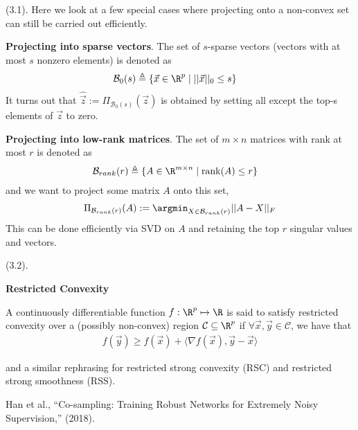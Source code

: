\documentclass[11pt]{article}
\begin{document}
\p {} (3.1). Here we look at a few special cases where projecting onto a non-convex set can still be carried out efficiently. 
\begin{compactitem}
	\item \textbf{Projecting into sparse vectors}. The set of $s$-sparse vectors (vectors with at most $s$ nonzero elements) is denoted as
	\begin{align}
	\mathcal{B}_0(s) 
	&\triangleq \{ \vec x  \in \R^p \mid ||\vec x ||_0 \le s   \}
	\end{align}
	It turns out that $\hat{\vec z} := \Pi_{\mathcal{B}_0(s)}(\vec z)$ is obtained by setting all except the top-s elements of $\vec z$ to zero. 
	
	\item \textbf{Projecting into low-rank matrices}. The set of $m \times n$ matrices with rank at most $r$ is denoted as
	\begin{align}
	\mathcal{B}_{rank}(r) 
	&\triangleq \{
	A \in \R^{m \times n} \mid
	\text{rank}(A) \le r
	\}
	\end{align}
	and we want to project some matrix $A$ onto this set,
	\begin{align}
	\Pi_{\mathcal{B}_{rank}(r)}(A)
	:= \argmin_{X \in \mathcal{B}_{rank}(r)} ||A - X||_F
	\end{align}
	This can be done efficiently via SVD on $A$ and retaining the top $r$ singular values and vectors.
\end{compactitem}


\myspace
\p {} (3.2).

\textbf{Restricted Convexity}
\begin{definition}[-1em]
	A continuously differentiable function $f : \R^p \mapsto \R$ is said to satisfy restricted convexity over a (possibly non-convex) region $\mathcal C \subseteq \R^p$ if $\forall \vec x, \vec y \in \mathcal C$, we have that
	\begin{align}
	f(\vec y) \ge f(\vec x) + \langle \nabla f(\vec x), \vec y - \vec x \rangle 
	\end{align}
\end{definition}
and a similar rephrasing for restricted strong convexity (RSC) and restricted strong smoothness (RSS). 


\vspace{-1em}
{\footnotesize Han et al., ``Co-sampling: Training Robust Networks for Extremely Noisy Supervision,'' (2018).}
\end{document}
